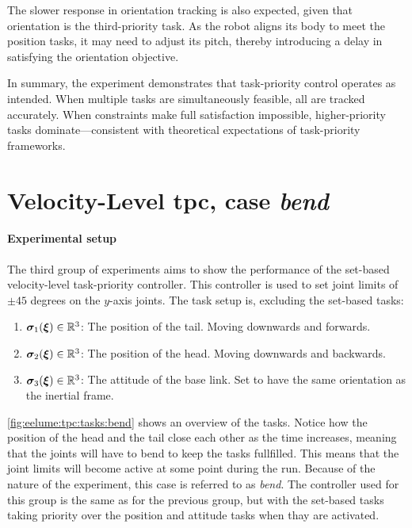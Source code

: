 The slower response in orientation tracking is also expected, given that orientation is the third-priority task. As the robot aligns its body to meet the position tasks, it may need to adjust its pitch, thereby introducing a delay in satisfying the orientation objective.

In summary, the experiment demonstrates that task-priority control operates as intended. When multiple tasks are simultaneously feasible, all are tracked accurately. When constraints make full satisfaction impossible, higher-priority tasks dominate—consistent with theoretical expectations of task-priority frameworks.


\FloatBarrier

\section{Velocity-Level \gls{tpc}, case \textit{bend}}

\paragraph{Experimental setup}
The third group of experiments aims to show the performance of the set-based
velocity-level task-priority controller. This controller is used to set
joint limits of \(\pm 45\) degrees on the \(y\)-axis joints. The task setup is,
excluding the set-based tasks:
\begin{enumerate}
    \item \(\bm{\sigma}_1(\bm{\xi}) \in \mathbb{R}^3\): The position of the tail. Moving downwards and forwards.
    \item \(\bm{\sigma}_2(\bm{\xi}) \in \mathbb{R}^3\): The position of the head. Moving downwards and backwards.
    \item \(\bm{\sigma}_3(\bm{\xi}) \in \mathbb{R}^3\): The attitude of the base link. Set to have the same orientation as the inertial frame.
\end{enumerate}
\autoref{fig:eelume:tpc:tasks:bend} shows an overview of the tasks. Notice how
the position of the head and the tail close each other as the time increases, meaning
that the joints will have to bend to keep the tasks fullfilled. This means
that the joint limits will become active at some point during the run. Because
of the nature of the experiment, this case is referred to as \textit{bend}.
The controller
used for this group is the same as for the previous group, but with the set-based
tasks taking priority over the position and attitude tasks when thay are activated.

